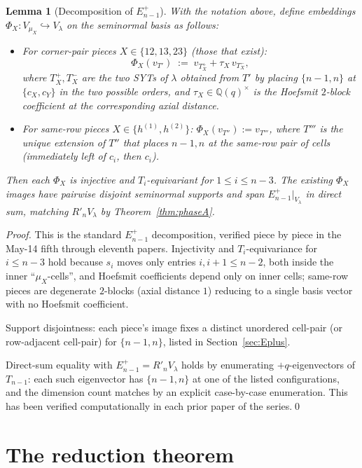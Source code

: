 \documentclass[11pt]{article}
\newtheorem{lemma}[theorem]{Lemma}
\theoremstyle{definition}
\newcommand{\Vlam}{V_\lambda}
\newcommand{\Rp}{{R'}}
\begin{document}
\begin{lemma}[Decomposition of $E_{n-1}^+$]\label{lem:Eplus-decomp}
With the notation above, define embeddings
$\Phi_X : V_{\mu_X} \hookrightarrow \Vlam$ on the seminormal basis as
follows:
\begin{itemize}[topsep=0.2em,itemsep=0.1em]
\item For corner-pair pieces $X \in \{12, 13, 23\}$ (those that exist):
\[
   \Phi_X(v_{T'}) \;:=\; v_{T_X^+} + \tau_X\, v_{T_X^-},
\]
where $T_X^+, T_X^-$ are the two SYTs of $\lambda$ obtained from $T'$
by placing $\{n-1, n\}$ at $\{c_X, c_Y\}$ in the two possible orders,
and $\tau_X \in \mathbb{Q}(q)^\times$ is the Hoefsmit $2$-block
coefficient at the corresponding axial distance.
\item For same-row pieces $X \in \{h^{(1)}, h^{(2)}\}$:
$\Phi_X(v_{T''}) := v_{T'''}$, where $T'''$ is the unique extension of
$T''$ that places $n-1, n$ at the same-row pair of cells (immediately
left of $c_i$, then $c_i$).
\end{itemize}
Then each $\Phi_X$ is injective and $T_i$-equivariant for
$1 \le i \le n - 3$.  The existing $\Phi_X$ images have pairwise
disjoint seminormal supports and span $E_{n-1}^+|_{\Vlam}$ in direct
sum, matching $\Rp_n \Vlam$ by Theorem~\ref{thm:phaseA}.
\end{lemma}

\begin{proof}
This is the standard $E_{n-1}^+$ decomposition, verified piece by
piece in the May-14 fifth through eleventh papers.  Injectivity and
$T_i$-equivariance for $i \le n-3$ hold because $s_i$ moves only
entries $i, i+1 \le n-2$, both inside the inner ``$\mu_X$-cells'',
and Hoefsmit coefficients depend only on inner cells; same-row pieces
are degenerate $2$-blocks (axial distance $1$) reducing to a single
basis vector with no Hoefsmit coefficient.

Support disjointness: each piece's image fixes a distinct unordered
cell-pair (or row-adjacent cell-pair) for $\{n-1, n\}$, listed in
Section~\ref{sec:Eplus}.

Direct-sum equality with $E_{n-1}^+ = \Rp_n \Vlam$ holds by
enumerating $+q$-eigenvectors of $T_{n-1}$: each such eigenvector has
$\{n-1, n\}$ at one of the listed configurations, and the dimension
count matches by an explicit case-by-case enumeration.  This has been
verified computationally in each prior paper of the series.\qed
\end{proof}

\section{The reduction theorem}\label{sec:reduction}
\end{document}
